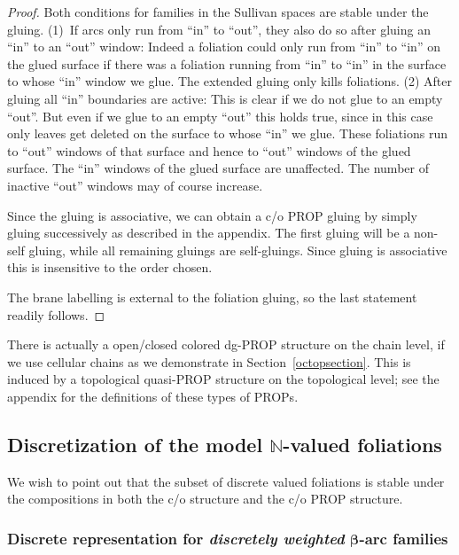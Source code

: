 \documentclass[pdftex]{sigma}
\begin{document}
\begin{proof}
Both conditions for families in the Sullivan spaces are stable under
the gluing. (1)~If arcs only run from ``in'' to ``out'', they also
do so after gluing an ``in'' to an ``out'' window: Indeed a
foliation could only run from ``in'' to ``in'' on the glued surface
if there was a foliation running from ``in'' to ``in'' in the
surface to whose ``in'' window we glue. The extended gluing only
kills foliations.  (2) After gluing all ``in'' boundaries are
active: This is clear if we do not glue to an empty ``out''. But
even if we glue to an empty ``out'' this holds true, since in this
case only leaves get deleted on the surface to whose ``in'' we glue.
These foliations run to ``out'' windows of that surface and hence to
``out'' windows of the glued surface. The ``in'' windows of the
glued surface are unaf\/fected. The number of inactive ``out'' windows
may of course increase.


Since the gluing is associative, we can obtain a c/o PROP gluing by
simply gluing successively as described in the appendix. The f\/irst
gluing will be a non-self gluing, while all remaining gluings are
self-gluings. Since gluing is associative this is insensitive to
the order chosen.

The brane labelling is external to the foliation gluing, so the last statement readily follows.
\end{proof}

There is actually a open/closed colored dg-PROP structure on the
chain level, if we use cellular chains as we demonstrate in
Section~\ref{octopsection}. This is induced by a topological quasi-PROP
structure on the topological level; see the appendix for the
def\/initions of these types of PROPs.

\subsection[Discretization of the model ${\mathbb N}$-valued foliations]{Discretization of the model $\boldsymbol{{\mathbb N}}$-valued foliations}

We wish to point out that the subset of discrete valued foliations is stable under the compositions
in both the c/o structure and the c/o PROP structure.


\subsubsection[Discrete representation for discretely weighted $\beta$-arc families]{Discrete representation for {\em discretely weighted} $\boldsymbol{\beta}$-arc families}
\end{document}
